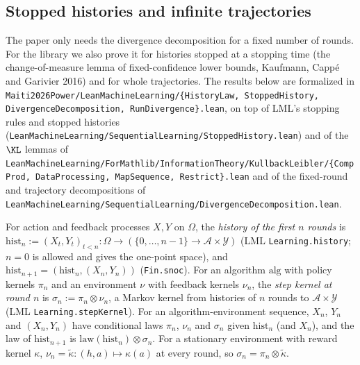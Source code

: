 \subsection{Stopped histories and infinite trajectories}
\label{sec:pre_info_stopping}

The paper only needs the divergence decomposition for a fixed number of rounds. For the library
we also prove it for histories stopped at a stopping time (the change-of-measure lemma of
fixed-confidence lower bounds, Kaufmann, Capp\'e and Garivier 2016) and for whole trajectories.
The results below are formalized in \texttt{Maiti2026Power/LeanMachineLearning/\{HistoryLaw,
StoppedHistory, DivergenceDecomposition, RunDivergence\}.lean}, on top of LML's stopping rules
and stopped histories (\texttt{LeanMachineLearning/SequentialLearning/StoppedHistory.lean}) and
of the $\KL$ lemmas of
\texttt{LeanMachineLearning/ForMathlib/InformationTheory/KullbackLeibler/\{CompProd,
DataProcessing, MapSequence, Restrict\}.lean} and of the fixed-round and trajectory
decompositions of \texttt{LeanMachineLearning/SequentialLearning/DivergenceDecomposition.lean}.

\begin{definition}\label{def:fin_history}
\leanok
{}
For action and feedback processes $X, Y$ on $\Omega$, the \emph{history of the first $n$ rounds}
is $\mathrm{hist}_n := (X_t, Y_t)_{t < n} : \Omega \to (\{0,\dots,n-1\}\to\mathcal{A}\times\mathcal{Y})$
(LML \texttt{Learning.history}; $n = 0$ is allowed and gives the one-point space), and
$\mathrm{hist}_{n+1} = (\mathrm{hist}_n, (X_n, Y_n))$ (\texttt{Fin.snoc}). For an algorithm
$\mathrm{alg}$ with policy kernels $\pi_n$ and an environment $\nu$ with feedback kernels
$\nu_n$, the \emph{step kernel at round $n$} is $\sigma_n := \pi_n\otimes\nu_n$, a Markov kernel
from histories of $n$ rounds to $\mathcal{A}\times\mathcal{Y}$ (LML \texttt{Learning.stepKernel}).
For an algorithm-environment sequence, $X_n$, $Y_n$ and $(X_n, Y_n)$ have conditional laws
$\pi_n$, $\nu_n$ and $\sigma_n$ given $\mathrm{hist}_n$ (and $X_n$), and the law of
$\mathrm{hist}_{n+1}$ is $\mathrm{law}(\mathrm{hist}_n)\otimes\sigma_n$. For a stationary
environment with reward kernel $\kappa$, $\nu_n = \tilde\kappa : (h, a)\mapsto\kappa(a)$ at
every round, so $\sigma_n = \pi_n\otimes\tilde\kappa$.
\end{definition}

